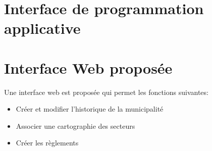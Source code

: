 \section{Interface de programmation applicative}\label{sec:meth_API}
\section{Interface Web proposée} \label{sec:meth_interface_web}
Une interface web est proposée qui permet les fonctions suivantes:
\begin{itemize}
    \item Créer et modifier l'historique de la municipalité
    \item Associer une cartographie des secteurs
    \item Créer les règlements
\end{itemize}